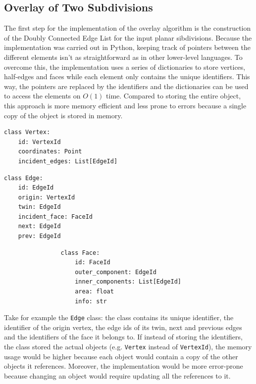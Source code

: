 \subsection{Overlay of Two Subdivisions}
The first step for the implementation of the overlay algorithm is the construction of the Doubly Connected Edge List for the input planar sibdivisions. Because the implementation was carried out in Python, keeping track of pointers between the different elements isn't as straightforward as in other lower-level languages. To overcome this, the implementation uses a series of dictionaries to store vertices, half-edges and faces while each element only contains the unique identifiers. This way, the pointers are replaced by the identifiers and the dictionaries can be used to access the elements on $O(1)$ time. Compared to storing the entire object, this approach is more memory efficient and less prone to errors because a single copy of the object is stored in memory.

\begin{minipage}{0.5\linewidth}
    \begin{lstlisting}
class Vertex:
    id: VertexId
    coordinates: Point
    incident_edges: List[EdgeId]
\end{lstlisting}
\end{minipage}
\begin{minipage}{0.5\linewidth}
    \begin{lstlisting}
class Edge:
    id: EdgeId
    origin: VertexId
    twin: EdgeId
    incident_face: FaceId
    next: EdgeId
    prev: EdgeId
\end{lstlisting}
\end{minipage}

\begin{minipage}{\linewidth}
    \begin{lstlisting}
                class Face:
                    id: FaceId
                    outer_component: EdgeId
                    inner_components: List[EdgeId]
                    area: float
                    info: str
\end{lstlisting}
\end{minipage}

Take for example the \texttt{Edge} class: the class contains its unique identifier, the identifier of the origin vertex, the edge ids of its twin, next and previous edges and the identifiers of the face it belongs to. If instead of storing the identifiers, the class stored the actual objects (e.g. \texttt{Vertex} instead of \texttt{VertexId}), the memory usage would be higher because each object would contain a copy of the other objects it references. Moreover, the implementation would be more error-prone because changing an object would require updating all the references to it.

